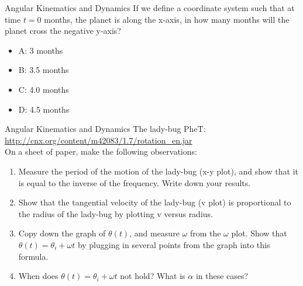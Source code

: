 \documentclass{beamer}
\begin{document}
\begin{frame}{Angular Kinematics and Dynamics}
If we define a coordinate system such that at time $t = 0$ months, the planet is along the x-axis, in how many months will the planet cross the negative y-axis?
\begin{itemize}
\item A: 3 months
\item B: 3.5 months
\item C: 4.0 months
\item D: 4.5 months
\end{itemize}
\end{frame}

\begin{frame}{Angular Kinematics and Dynamics}
\small
The lady-bug PheT: \\
\url{http://cnx.org/content/m42083/1.7/rotation_en.jar} \\ \vspace{0.5cm}
On a sheet of paper, make the following observations:
\begin{enumerate}
\item Measure the period of the motion of the lady-bug (x-y plot), and show that it is equal to the inverse of the frequency.  Write down your results.
\item Show that the tangential velocity of the lady-bug (v plot) is proportional to the radius of the lady-bug by plotting v versus radius.
\item Copy down the graph of $\theta(t)$, and measure $\omega$ from the $\omega$ plot.  Show that $\theta(t) = \theta_i + \omega t$ by plugging in several points from the graph into this formula.
\item When does $\theta(t) = \theta_i + \omega t$ not hold?  What is $\alpha$ in these cases?
\end{enumerate}
\end{frame}
\end{document}
